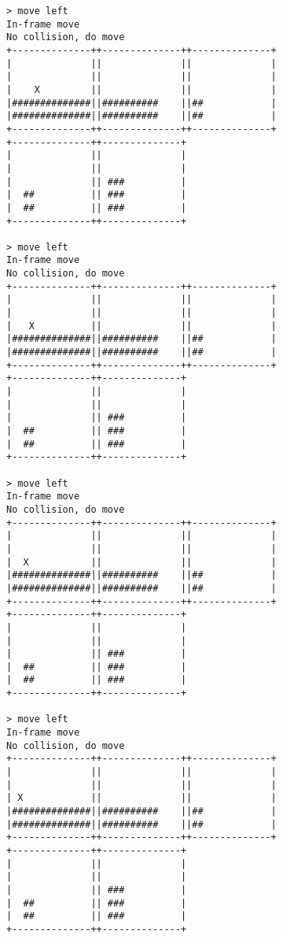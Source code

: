 \begin{verbatim}
> move left
In-frame move
No collision, do move
+--------------++--------------++--------------+
|              ||              ||              |
|              ||              ||              |
|    X         ||              ||              |
|##############||##########    ||##            |
|##############||##########    ||##            |
+--------------++--------------++--------------+
+--------------++--------------+                
|              ||              |                
|              ||              |                
|              || ###          |                
|  ##          || ###          |                
|  ##          || ###          |                
+--------------++--------------+                

> move left
In-frame move
No collision, do move
+--------------++--------------++--------------+
|              ||              ||              |
|              ||              ||              |
|   X          ||              ||              |
|##############||##########    ||##            |
|##############||##########    ||##            |
+--------------++--------------++--------------+
+--------------++--------------+                
|              ||              |                
|              ||              |                
|              || ###          |                
|  ##          || ###          |                
|  ##          || ###          |                
+--------------++--------------+                

> move left
In-frame move
No collision, do move
+--------------++--------------++--------------+
|              ||              ||              |
|              ||              ||              |
|  X           ||              ||              |
|##############||##########    ||##            |
|##############||##########    ||##            |
+--------------++--------------++--------------+
+--------------++--------------+                
|              ||              |                
|              ||              |                
|              || ###          |                
|  ##          || ###          |                
|  ##          || ###          |                
+--------------++--------------+                

> move left
In-frame move
No collision, do move
+--------------++--------------++--------------+
|              ||              ||              |
|              ||              ||              |
| X            ||              ||              |
|##############||##########    ||##            |
|##############||##########    ||##            |
+--------------++--------------++--------------+
+--------------++--------------+                
|              ||              |                
|              ||              |                
|              || ###          |                
|  ##          || ###          |                
|  ##          || ###          |                
+--------------++--------------+                


\end{verbatim}

